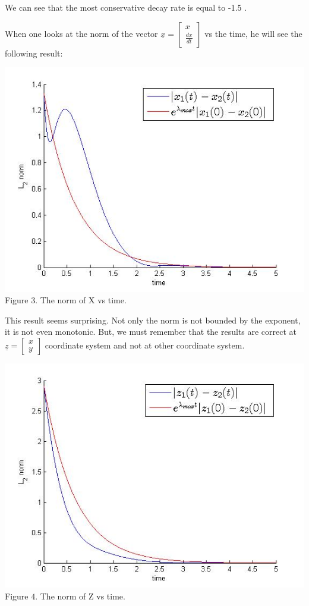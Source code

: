 \documentclass[10pt,onecolumn,twoside,letter]{IEEEtran}
\theoremstyle{plain}
\begin{document}
We can see that the most conservative decay rate is equal to -1.5 .


When one looks at the norm of the vector $\underline{x} =  \begin{bmatrix} x \\ \frac{dx}{dt} \end{bmatrix}$ vs the time, he will see the following result: 

\begin{center}
\includegraphics[scale=0.55]{xNormOverTime} \vspace{-4mm}
{Figure $3$. The norm of X vs time.}
\end{center}

This result seems surprising. Not only the norm is not bounded by the exponent, it is not even monotonic. But, we must remember that the results are correct at $\underline{z} =  \begin{bmatrix} x \\ y \end{bmatrix}$ coordinate system and not at other coordinate system. 

\begin{center}
\includegraphics[scale=0.55]{zNormOverTime} \vspace{-4mm}
{Figure $4$. The norm of Z vs time.}
\end{center}



\end{document}

